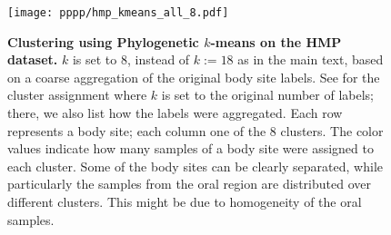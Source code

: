 \begin{figure}[hpbt]
    \centering
    \texttt{[image: pppp/hmp\_kmeans\_all\_8.pdf]}
    \caption[Clustering using Phylogenetic $k$-means on the HMP dataset]{
        \textbf{Clustering using Phylogenetic $k$-means on the HMP dataset.}
        $k$ is set to 8, instead of $k:=18$ as in the main text,
        based on a coarse aggregation of the original body site labels.
        See  for the cluster assignment where $k$ is set to the original number of labels;
        there, we also list how the labels were aggregated.
        Each row represents a body site; each column one of the \num{8} clusters.
        The color values indicate how many samples of a body site were assigned to each cluster.
        Some of the body sites can be clearly separated,
        while particularly the samples from the oral region are distributed over different clusters.
        This might be due to %
        homogeneity of the oral samples.
    }
    \label{fig:hmp_kmeans_all_8}
\end{figure}



